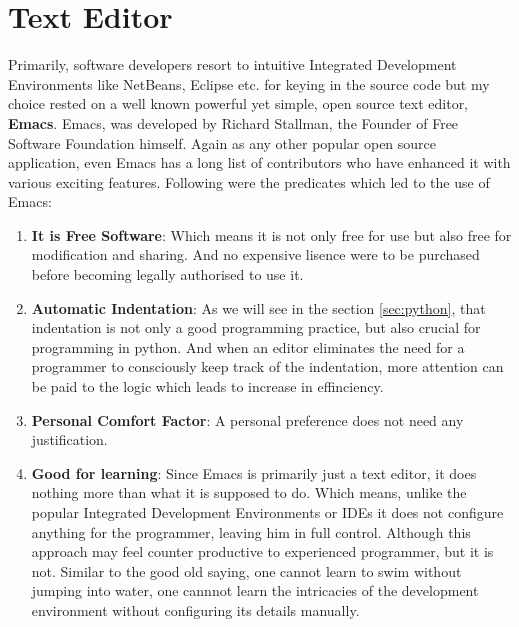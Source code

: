 \section {Text Editor}
Primarily, software developers resort to intuitive Integrated Development Environments like NetBeans, Eclipse etc. for keying in the source code but my choice rested on a well known powerful yet simple, open source text editor, \textbf{Emacs}. Emacs, was developed by Richard Stallman, the Founder of Free Software Foundation himself. Again as any other popular open source application, even Emacs has a long list of contributors who have enhanced it with various exciting features. Following were the predicates which led to the use of Emacs:
\begin{enumerate}
  \item \textbf{It is Free Software}: Which means it is not only free for use but also free for modification and sharing. And no expensive lisence were to be purchased before becoming legally authorised to use it.
  \item \textbf{Automatic Indentation}: As we will see in the section \ref{sec:python}, that indentation is not only a good programming practice, but also crucial for programming in python. And when an editor eliminates the need for a programmer to consciously keep track of the indentation, more attention can be paid to the logic which leads to increase in effinciency.
  \item \textbf{Personal Comfort Factor}: A personal preference does not need any justification.
  \item \textbf{Good for learning}: Since Emacs is primarily just a text editor, it does nothing more than what it is supposed to do. Which means, unlike the popular Integrated Development Environments or IDEs it does not configure anything for the programmer, leaving him in full control. Although this approach may feel counter productive to experienced programmer, but it is not. Similar to the good old saying, one cannot learn to swim without jumping into water, one cannnot learn the intricacies of the development environment without configuring its details manually. 
\end{enumerate}

